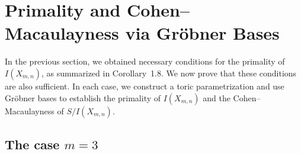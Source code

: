 \documentclass[12pt]{amsart}
\numberwithin{equation}{section}
\begin{document}
\section{Primality and Cohen–Macaulayness via Gröbner Bases}

In the previous section, we obtained necessary conditions
for the primality of $I(X_{m,n})$, as summarized in
Corollary~1.8. We now prove that these conditions are also
sufficient. In each case, we construct a toric parametrization
and use Gr\"obner bases to establish the primality of
$I(X_{m,n})$ and the Cohen--Macaulayness of $S/I(X_{m,n})$.


\subsection{The case $m=3$}\label{subsec:m=3}
\end{document}
